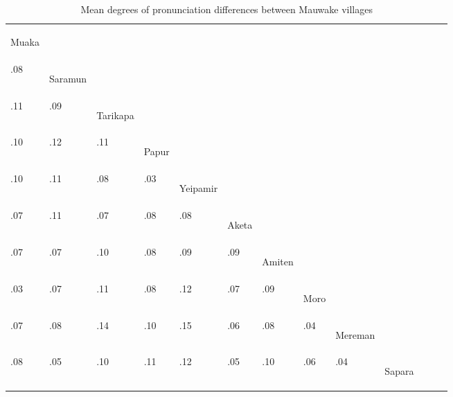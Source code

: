 \begin{table}
\caption{Mean degrees of pronunciation differences between Mauwake villages}
\label{tab:1:pronunciationdiff}
\begin{tabularx}{\textwidth}{lllllllllllll}

\mytoprule  
\begin{rotate}{0}{Muaka}\end{rotate}\\ 
.08 & \begin{rotate}{0}{Saramun}\end{rotate} &  &  &  &  &  &  &  &  &  &  &  \\

.11 & .09 & \begin{rotate}{0}{Tarikapa}\end{rotate}  &  &  &  &  &  &  &  &  &  &\\

.10 & .12 & .11 & \begin{rotate}{0}{Papur}\end{rotate} &  &  &  &  &  &  &  &  &\\

.10 & .11 & .08 & .03 & \begin{rotate}{0}{Yeipamir}\end{rotate} &  &  &  &  &  &  &  &\\

.07 & .11 & .07 & .08 & .08 & \begin{rotate}{0}{Aketa}\end{rotate} &  &  &  &  &  &  &\\

.07 & .07 & .10 & .08 & .09 & .09 & \begin{rotate}{0}{Amiten}\end{rotate} &  &  &  &  &  &\\

.03 & .07 & .11 & .08 & .12 & .07 & .09 & \begin{rotate}{0}{Moro}\end{rotate} &  &  &  &  &\\

.07 & .08 & .14 & .10 & .15 & .06 & .08 & .04 &\begin{rotate}{0}{ Mereman}\end{rotate} &  &  &  & \\

.08 & .05 & .10 & .11 & .12 & .05 & .10 & .06 & .04 & \begin{rotate}{0}{Sapara}\end{rotate} &  &  & \\


\end{tabularx}
\end{table}
